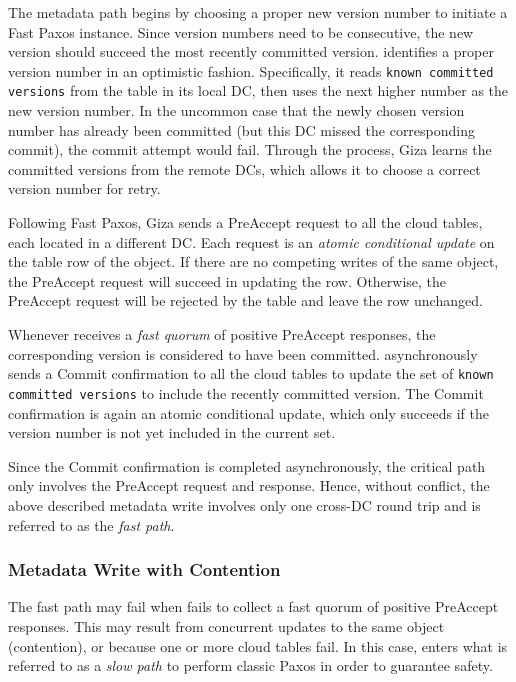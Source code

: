 The metadata path begins by choosing a proper new version number to initiate a 
Fast Paxos instance. Since version numbers need to be consecutive, 
the new version should succeed the most recently committed version.
{\name} identifies a proper version number in an optimistic fashion.
Specifically, it reads {\tt known committed versions} from the table in its local DC,
then uses the next higher number as the new version number.
In the uncommon case that the newly chosen version number has already been committed
(but this DC missed the corresponding commit), the commit attempt would fail.
Through the process, Giza learns the committed versions from the remote DCs,
which allows it to choose a correct version number for retry.

Following Fast Paxos, Giza sends a PreAccept request to all the cloud tables,
each located in a different DC. Each request is an {\em atomic conditional
  update} on the table row of the object. If there are no competing writes of
the same object, the PreAccept request will succeed in updating the row.
Otherwise, the PreAccept request will be rejected by the table and leave the row
unchanged.

Whenever {\name} receives a {\em fast quorum} of positive PreAccept
responses, the corresponding version is considered to have been committed.
{\name} asynchronously sends a Commit confirmation to all the cloud tables
to update the set of {\tt known committed versions} to include the recently
committed version. The Commit confirmation is again an atomic conditional
update, which only succeeds if the version number is not yet included in the
current set.

Since the Commit confirmation is completed asynchronously, the critical path
only involves the PreAccept request and response. Hence, without conflict, the
above described metadata write involves only one cross-DC round trip and is
referred to as the {\em fast path}.

\subsubsection{Metadata Write with Contention}

The fast path may fail when {\name} fails to collect a fast quorum of
positive PreAccept responses. This may result from concurrent updates to the
same object (contention), or because one or more cloud tables fail. In this
case, {\name} enters what is referred to as a \emph{slow path} to perform
classic Paxos in order to guarantee safety.

